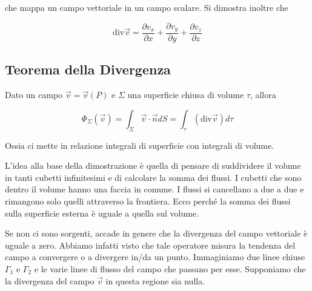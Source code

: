 che mappa un campo vettoriale in un campo scalare. Si dimostra inoltre che

\[
	\text{div}\vec{v} = \frac{\partial v_x}{\partial x} +\frac{\partial v_y}{\partial y} +\frac{\partial v_z}{\partial z}
\]

\subsection{Teorema della Divergenza}

Dato un campo $\vec{v}=\vec{v}(P)$ e $\Sigma$ una superficie chiusa di volume $\tau$, allora

\[
	\boxed{\Phi_{\Sigma}(\vec{v} ) = \int_{\Sigma}\vec{v} \cdot \vec{n} dS = \int_{\tau}(\text{div}\vec{v} )d\tau}
\]

Ossia ci mette in relazione integrali di superficie con integrali di volume.

L'idea alla base della dimostrazione è quella di pensare di suddividere
il volume in tanti cubetti infinitesimi e di calcolare la somma dei flussi.
I cubetti che sono dentro il volume hanno una faccia in comune. I flussi si cancellano a due a due e rimangono solo quelli attraverso la frontiera. Ecco perché la somma dei flussi sulla superficie esterna è uguale a quella sul volume.

Se non ci sono sorgenti, accade in genere che la divergenza del campo vettoriale è uguale a zero. Abbiamo infatti visto che tale operatore misura la tendenza del campo a convergere o a divergere in/da un punto. Immaginiamo due linee chiuse $\Gamma_1$ e $\Gamma_2$ e le varie linee di flusso del campo che passano per esse. Supponiamo che la divergenza del campo $\vec{v}$ in questa regione sia nulla.

